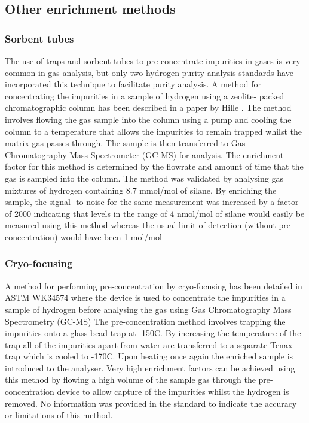 \subsection{Other enrichment methods}
\subsubsection{Sorbent tubes}
The use of traps and sorbent tubes to pre-concentrate impurities in gases is very common in gas analysis, 
but only two hydrogen purity analysis standards have incorporated this technique to facilitate purity analysis. 
A method for concentrating the impurities in a sample of hydrogen using a zeolite- packed chromatographic 
column has been described in a paper by Hille \cite{Hille1990a}. The method involves flowing the gas sample into the column 
using a pump and cooling the column to a temperature that allows the impurities to remain trapped whilst the 
matrix gas passes through. The sample is then transferred to Gas Chromatography Mass Spectrometer (GC-MS) for analysis. The enrichment factor for 
this method is determined by the flowrate and amount of time that the gas is sampled into the column. 
The method was validated by analysing gas mixtures of hydrogen containing 8.7 mmol/mol of silane. 
By enriching the sample, the signal- to-noise for the same measurement was increased by a factor of 2000 
indicating that levels in the range of 4 nmol/mol of silane would easily be measured using this method 
whereas the usual limit of detection (without pre-concentration) would have been 1 \textmu mol/mol

\subsubsection{Cryo-focusing}
A method for performing pre-concentration by cryo-focusing has been detailed in ASTM WK34574 
where the device is used to concentrate the impurities in a sample of hydrogen before analysing 
the gas using Gas Chromatography Mass Spectrometry (GC-MS) \cite{Murugan2015} The pre-concentration method involves trapping the impurities onto a glass bead trap 
at -150\textdegree C. By increasing the temperature of the trap all of the impurities apart from water 
are transferred to a separate Tenax trap which is cooled to -170\textdegree C. 
Upon heating once again the enriched sample is introduced to the analyser. 
Very high enrichment factors can be achieved using this method by flowing a high volume of the sample 
gas through the pre-concentration device to allow capture of the impurities whilst the hydrogen is removed. 
No information was provided in the standard to indicate the accuracy or limitations of this method.

